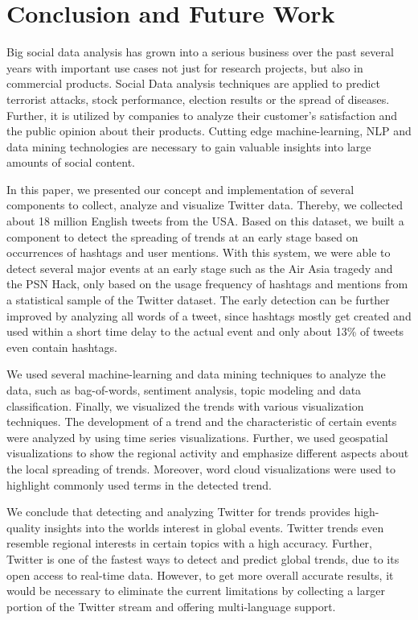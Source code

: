 
\chapter{Conclusion and Future Work}
\label{cha:conclusion-future-work}
Big social data analysis has grown into a serious business over the past several years with important use cases not just for research projects, but also in commercial products. Social Data analysis techniques are applied to predict terrorist attacks, stock performance, election results or the spread of diseases. Further, it is utilized by companies to analyze their customer’s satisfaction and the public opinion about their products. Cutting edge machine-learning, NLP and data mining technologies are necessary to gain valuable insights into large amounts of social content.

In this paper, we presented our concept and implementation of several components to collect, analyze and visualize Twitter data. Thereby, we collected about 18 million English tweets from the USA. Based on this dataset, we built a component to detect the spreading of trends at an early stage based on occurrences of hashtags and user mentions. With this system, we were able to detect several major events at an early stage such as the Air Asia tragedy and the PSN Hack, only based on the usage frequency of hashtags and mentions from a statistical sample of the Twitter dataset. The early detection can be further improved by analyzing all words of a tweet, since hashtags mostly get created and used within a short time delay to the actual event and only about 13\% of tweets even contain hashtags.


We used several machine-learning and data mining techniques to analyze the data, such as bag-of-words, sentiment analysis, topic modeling and data classification. Finally, we visualized the trends with various visualization techniques. The development of a trend and the characteristic of certain events were analyzed by using time series visualizations. Further, we used geospatial visualizations to show the regional activity and emphasize different aspects about the local spreading of trends. Moreover, word cloud visualizations were used to highlight commonly used terms in the detected trend.

We conclude that detecting and analyzing Twitter for trends provides high-quality insights into the worlds interest in global events. Twitter trends even resemble regional interests in certain topics with a high accuracy. Further, Twitter is one of the fastest ways to detect and predict global trends, due to its open access to real-time data. However, to get more overall accurate results, it would be necessary to eliminate the current limitations by collecting a larger portion of the Twitter stream and offering multi-language support.
